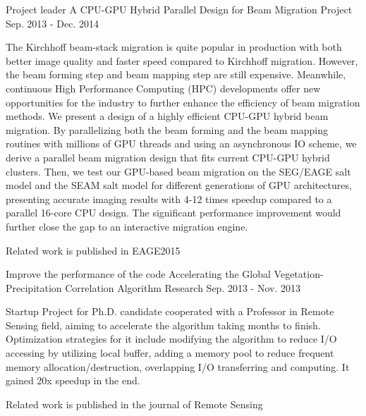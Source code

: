 \documentclass[11pt, a4paper]{awesome-cv}
\begin{document}
\begin{cventries}
  \cventry
    {Project leader} %
    {A CPU-GPU Hybrid Parallel Design for Beam Migration} %
    {Project} %
    {Sep. 2013 - Dec. 2014} %
    {
      \begin{cvitems} %
        \item {The Kirchhoff beam-stack migration is quite popular in production with both better image quality and faster speed compared to Kirchhoff migration.  However, the beam forming step and beam mapping step are still expensive. Meanwhile, continuous High Performance Computing (HPC) developments offer new opportunities for the industry to further enhance the efficiency of beam migration methods. We present a design of a highly efficient CPU-GPU hybrid beam migration.  By parallelizing both the beam forming and the beam mapping routines with millions of GPU threads and using an asynchronous IO scheme, we derive a parallel beam migration design that fits current CPU-GPU hybrid clusters.  Then, we test our GPU-based beam migration on the SEG/EAGE salt model and the SEAM salt model for different generations of GPU architectures, presenting accurate imaging results with 4-12 times speedup compared to a parallel 16-core CPU design. The significant performance improvement would further close the gap to an interactive migration engine.}
        \item {Related work is published in EAGE2015}
      \end{cvitems}
    }

  \cventry
    {Improve the performance of the code} %
    {Accelerating the Global Vegetation-Precipitation Correlation Algorithm} %
    {Research} %
    {Sep. 2013 - Nov. 2013} %
    {
      \begin{cvitems} %
        \item {Startup Project for Ph.D. candidate cooperated with a Professor in Remote Sensing field, aiming to accelerate the algorithm taking months to finish. Optimization strategies for it include modifying the algorithm to reduce I/O accessing by utilizing local buffer, adding a memory pool to reduce frequent memory allocation/destruction, overlapping I/O transferring and computing. It gained 20x speedup in the end.}
        \item {Related work is published in the journal of Remote Sensing}
      \end{cvitems}
    }

\end{cventries}
\end{document}

